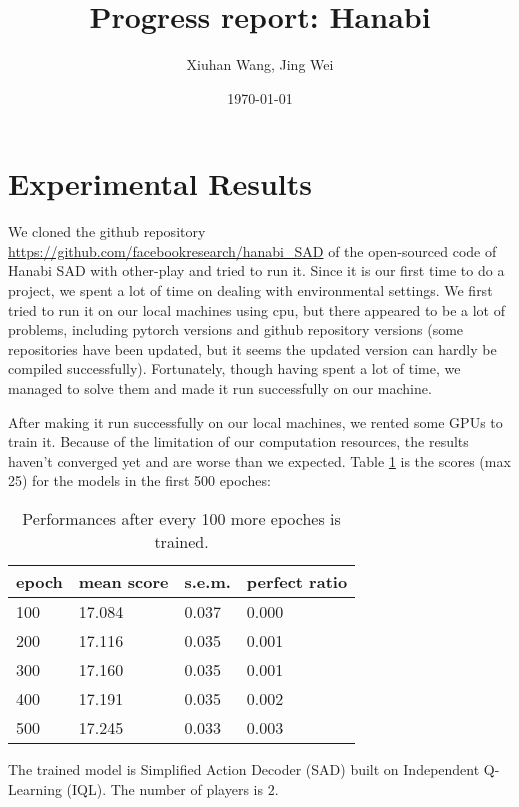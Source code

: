 \documentclass[12pt]{article}
\begin{document}
\title{\bf Progress report: Hanabi}
\author{Xiuhan Wang, Jing Wei}
\date{\today}
\maketitle

\section{Experimental Results}
We cloned the github repository \url{https://github.com/facebookresearch/hanabi_SAD} of the open-sourced code of Hanabi SAD with other-play \citep{hu2020other} and tried to run it. Since it is our first time to do a project, we spent a lot of time on dealing with environmental settings. We first tried to run it on our local machines using cpu, but there appeared to be a lot of problems, including pytorch versions and github repository versions (some repositories have been updated, but it seems the updated version can hardly be compiled successfully). Fortunately, though having spent a lot of time, we managed to solve them and made it run successfully on our machine.

After making it run successfully on our local machines, we rented some GPUs to train it. Because of the limitation of our computation resources, the results haven't converged yet and are worse than we expected. Table \ref{Tab1} is the scores (max 25) for the models in the first 500 epoches:
\begin{table}[H]
\begin{centering}
\begin{tabular}{|l|l|l|l|}
\hline
epoch & mean score & s.e.m. & perfect ratio \\ \hline
100 & 17.084 & 0.037 & 0.000 \\ \hline
200 & 17.116 & 0.035 & 0.001 \\ \hline  
300 & 17.160 & 0.035 & 0.001 \\ \hline
400 & 17.191 & 0.035 & 0.002 \\ \hline
500 & 17.245 & 0.033 & 0.003 \\ \hline
\end{tabular}
\caption{Performances after every 100 more epoches is trained.}
\label{Tab1}
\end{centering}
\end{table}

The trained model is Simplified Action Decoder (SAD) built on Independent Q-Learning (IQL). The number of players is $2$.
\end{document}
